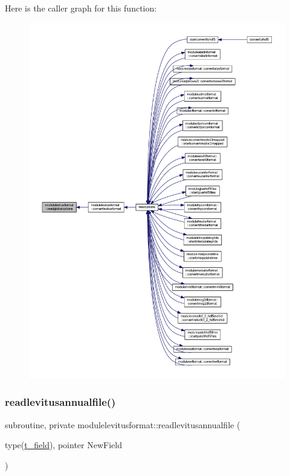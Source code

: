 Here is the caller graph for this function\+:\nopagebreak
\begin{figure}[H]
\begin{center}
\leavevmode
\includegraphics[width=350pt]{namespacemodulelevitusformat_a3776b26027a1df5b06714f551024abed_icgraph}
\end{center}
\end{figure}
\mbox{\label{namespacemodulelevitusformat_aefc320bae22e2d949151376118a03ce4}} 
\subsubsection{\texorpdfstring{readlevitusannualfile()}{readlevitusannualfile()}}
{\footnotesize\ttfamily subroutine, private modulelevitusformat\+::readlevitusannualfile (\begin{DoxyParamCaption}\item[{type(\mbox{\hyperlink{structmodulelevitusformat_1_1t__field}{t\+\_\+field}}), pointer}]{New\+Field }\end{DoxyParamCaption})\hspace{0.3cm}{\ttfamily [private]}}

